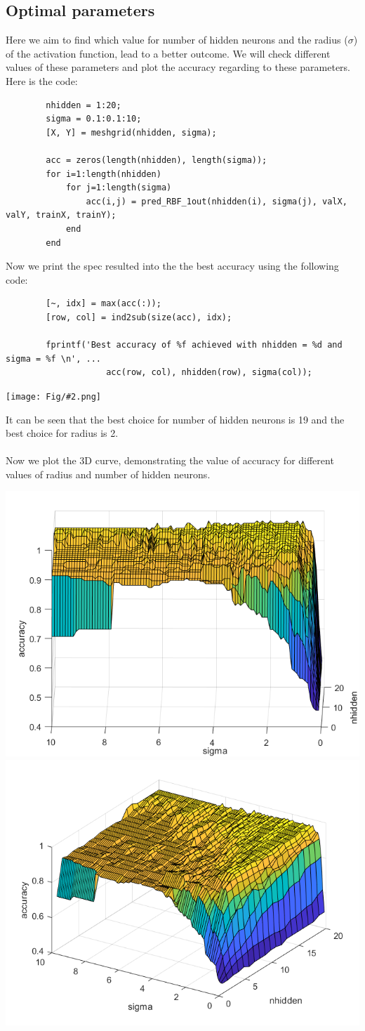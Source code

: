 \documentclass[]{article}
\newcommand{\pict}[2]{\begin{center}
		\texttt{[image: Fig/\#2.png]}
\end{center}}
\begin{document}
	\subsection{Optimal parameters}
	Here we aim to find which value for number of hidden neurons and the radius ($\sigma$) of the activation function, lead to a better outcome. We will check different values of these parameters and plot the accuracy regarding to these parameters. Here is the code:
	\begin{lstlisting}
		nhidden = 1:20;
		sigma = 0.1:0.1:10;
		[X, Y] = meshgrid(nhidden, sigma);
		
		acc = zeros(length(nhidden), length(sigma));
		for i=1:length(nhidden)
			for j=1:length(sigma)
				acc(i,j) = pred_RBF_1out(nhidden(i), sigma(j), valX, valY, trainX, trainY);
			end
		end
	\end{lstlisting}
	Now we print the spec resulted into the the best accuracy using the following code:
	\begin{lstlisting}
		[~, idx] = max(acc(:));
		[row, col] = ind2sub(size(acc), idx);
		
		fprintf('Best accuracy of %f achieved with nhidden = %d and sigma = %f \n', ...
			   		acc(row, col), nhidden(row), sigma(col));
	\end{lstlisting}
	\pict{0.7}{F5}
	It can be seen that the best choice for number of hidden neurons is 19 and the best choice for radius is 2.\\\\
	Now we plot the 3D curve, demonstrating the value of accuracy for different values of radius and number of hidden neurons.
	\begin{center}
		\includegraphics[width=0.4\linewidth]{Fig/F3.png}
		\qquad\qquad
		\includegraphics[width=0.4\linewidth]{Fig/F4.png}
	\end{center}
	
\end{document}
